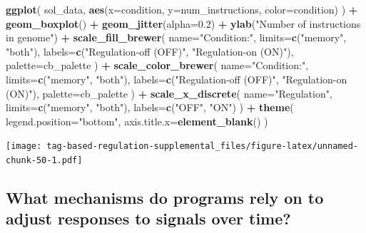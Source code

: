 \documentclass[]{book}
\newenvironment{Shaded}{\begin{snugshade}}{\end{snugshade}}
\newcommand{\DataTypeTok}[1]{\textcolor[rgb]{0.13,0.29,0.53}{#1}}
\newcommand{\FloatTok}[1]{\textcolor[rgb]{0.00,0.00,0.81}{#1}}
\newcommand{\KeywordTok}[1]{\textcolor[rgb]{0.13,0.29,0.53}{\textbf{#1}}}
\newcommand{\NormalTok}[1]{#1}
\newcommand{\OperatorTok}[1]{\textcolor[rgb]{0.81,0.36,0.00}{\textbf{#1}}}
\newcommand{\StringTok}[1]{\textcolor[rgb]{0.31,0.60,0.02}{#1}}
\begin{document}
\begin{Shaded}
\begin{Highlighting}[]
\KeywordTok{ggplot}\NormalTok{( sol_data, }\KeywordTok{aes}\NormalTok{(}\DataTypeTok{x=}\NormalTok{condition, }\DataTypeTok{y=}\NormalTok{num_instructions, }\DataTypeTok{color=}\NormalTok{condition) ) }\OperatorTok{+}
\StringTok{  }\KeywordTok{geom_boxplot}\NormalTok{() }\OperatorTok{+}
\StringTok{  }\KeywordTok{geom_jitter}\NormalTok{(}\DataTypeTok{alpha=}\FloatTok{0.2}\NormalTok{) }\OperatorTok{+}
\StringTok{  }\KeywordTok{ylab}\NormalTok{(}\StringTok{"Number of instructions in genome"}\NormalTok{) }\OperatorTok{+}
\StringTok{  }\KeywordTok{scale_fill_brewer}\NormalTok{(}
    \DataTypeTok{name=}\StringTok{"Condition:"}\NormalTok{,}
    \DataTypeTok{limits=}\KeywordTok{c}\NormalTok{(}\StringTok{"memory"}\NormalTok{, }\StringTok{"both"}\NormalTok{),}
    \DataTypeTok{labels=}\KeywordTok{c}\NormalTok{(}\StringTok{"Regulation-off (OFF)"}\NormalTok{, }\StringTok{"Regulation-on (ON)"}\NormalTok{),}
    \DataTypeTok{palette=}\NormalTok{cb_palette}
\NormalTok{  ) }\OperatorTok{+}
\StringTok{  }\KeywordTok{scale_color_brewer}\NormalTok{(}
    \DataTypeTok{name=}\StringTok{"Condition:"}\NormalTok{,}
    \DataTypeTok{limits=}\KeywordTok{c}\NormalTok{(}\StringTok{"memory"}\NormalTok{, }\StringTok{"both"}\NormalTok{),}
    \DataTypeTok{labels=}\KeywordTok{c}\NormalTok{(}\StringTok{"Regulation-off (OFF)"}\NormalTok{, }\StringTok{"Regulation-on (ON)"}\NormalTok{),}
    \DataTypeTok{palette=}\NormalTok{cb_palette}
\NormalTok{  ) }\OperatorTok{+}
\StringTok{  }\KeywordTok{scale_x_discrete}\NormalTok{(}
    \DataTypeTok{name=}\StringTok{"Regulation"}\NormalTok{,}
    \DataTypeTok{limits=}\KeywordTok{c}\NormalTok{(}\StringTok{"memory"}\NormalTok{, }\StringTok{"both"}\NormalTok{),}
    \DataTypeTok{labels=}\KeywordTok{c}\NormalTok{(}\StringTok{"OFF"}\NormalTok{, }\StringTok{"ON"}\NormalTok{)}
\NormalTok{  ) }\OperatorTok{+}
\StringTok{  }\KeywordTok{theme}\NormalTok{(}
    \DataTypeTok{legend.position=}\StringTok{"bottom"}\NormalTok{,}
    \DataTypeTok{axis.title.x=}\KeywordTok{element_blank}\NormalTok{()}
\NormalTok{  )}
\end{Highlighting}
\end{Shaded}

\texttt{[image: tag-based-regulation-supplemental\_files/figure-latex/unnamed-chunk-50-1.pdf]}

\hypertarget{what-mechanisms-do-programs-rely-on-to-adjust-responses-to-signals-over-time}{%
\subsection{What mechanisms do programs rely on to adjust responses to signals over time?}\label{what-mechanisms-do-programs-rely-on-to-adjust-responses-to-signals-over-time}}
\end{document}

